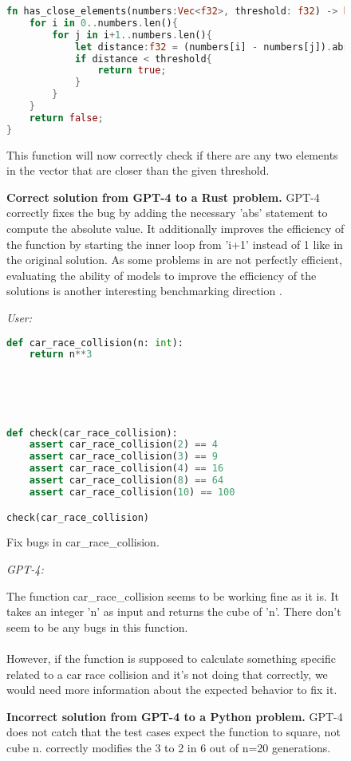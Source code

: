 \begin{figure}[htbp]
\begin{lstlisting}[language=Rust,breaklines=true,basicstyle=\ttfamily\scriptsize]
fn has_close_elements(numbers:Vec<f32>, threshold: f32) -> bool{
    for i in 0..numbers.len(){
        for j in i+1..numbers.len(){
            let distance:f32 = (numbers[i] - numbers[j]).abs();
            if distance < threshold{
                return true;
            }
        }
    }
    return false;
}
\end{lstlisting}

This function will now correctly check if there are any two elements in the vector that are closer than the given threshold.

\hrulefill
\caption{\textbf{Correct solution from GPT-4 to a \evalf{} Rust problem.} GPT-4 correctly fixes the bug by adding the necessary 'abs' statement to compute the absolute value. It additionally improves the efficiency of the function by starting the inner loop from 'i+1' instead of 1 like in the original solution. As some problems in \eval{} are not perfectly efficient, evaluating the ability of models to improve the efficiency of the solutions is another interesting benchmarking direction \citep{yetistiren2022assessing}.}
\label{fig:gpt4rs}
\end{figure}



\begin{figure}[htbp]
\hrulefill

\emph{User:}

\hrulefill

\begin{lstlisting}[language=Python,breaklines=true,basicstyle=\ttfamily\scriptsize]
def car_race_collision(n: int):
    return n**3





def check(car_race_collision):
    assert car_race_collision(2) == 4
    assert car_race_collision(3) == 9
    assert car_race_collision(4) == 16
    assert car_race_collision(8) == 64
    assert car_race_collision(10) == 100

check(car_race_collision)
\end{lstlisting}
Fix bugs in car\_race\_collision.

\hrulefill

\emph{GPT-4:}

\hrulefill

The function car\_race\_collision seems to be working fine as it is. It takes an integer 'n' as input and returns the cube of 'n'. There don't seem to be any bugs in this function. \\\\
However, if the function is supposed to calculate something specific related to a car race collision and it's not doing that correctly, we would need more information about the expected behavior to fix it.

\hrulefill
\caption{\textbf{Incorrect solution from GPT-4 to a \evalf{} Python problem.} GPT-4 does not catch that the test cases expect the function to square, not cube n. \model{} correctly modifies the 3 to 2 in 6 out of n=20 generations.}
\label{fig:gpt4pyrefuse}
\end{figure}



